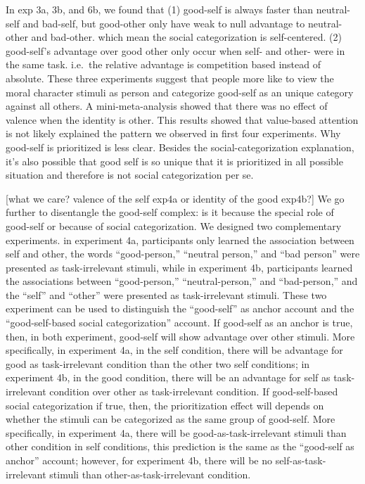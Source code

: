 \documentclass[
  english,
  man]{apa6}
\begin{document}
In exp 3a, 3b, and 6b, we found that (1) good-self is always faster than neutral-self and bad-self, but good-other only have weak to null advantage to neutral-other and bad-other. which mean the social categorization is self-centered. (2) good-self's advantage over good other only occur when self- and other- were in the same task. i.e.~the relative advantage is competition based instead of absolute. These three experiments suggest that people more like to view the moral character stimuli as person and categorize good-self as an unique category against all others. A mini-meta-analysis showed that there was no effect of valence when the identity is other. This results showed that value-based attention is not likely explained the pattern we observed in first four experiments. Why good-self is prioritized is less clear. Besides the social-categorization explanation, it's also possible that good self is so unique that it is prioritized in all possible situation and therefore is not social categorization per se.

{[}what we care? valence of the self exp4a or identity of the good exp4b?{]} We go further to disentangle the good-self complex: is it because the special role of good-self or because of social categorization. We designed two complementary experiments. in experiment 4a, participants only learned the association between self and other, the words ``good-person,'' ``neutral person,'' and ``bad person'' were presented as task-irrelevant stimuli, while in experiment 4b, participants learned the associations between ``good-person,'' ``neutral-person,'' and ``bad-person,'' and the ``self'' and ``other'' were presented as task-irrelevant stimuli. These two experiment can be used to distinguish the ``good-self'' as anchor account and the ``good-self-based social categorization'' account. If good-self as an anchor is true, then, in both experiment, good-self will show advantage over other stimuli. More specifically, in experiment 4a, in the self condition, there will be advantage for good as task-irrelevant condition than the other two self conditions; in experiment 4b, in the good condition, there will be an advantage for self as task-irrelevant condition over other as task-irrelevant condition. If good-self-based social categorization if true, then, the prioritization effect will depends on whether the stimuli can be categorized as the same group of good-self. More specifically, in experiment 4a, there will be good-as-task-irrelevant stimuli than other condition in self conditions, this prediction is the same as the ``good-self as anchor'' account; however, for experiment 4b, there will be no self-as-task-irrelevant stimuli than other-as-task-irrelevant condition.
\end{document}
